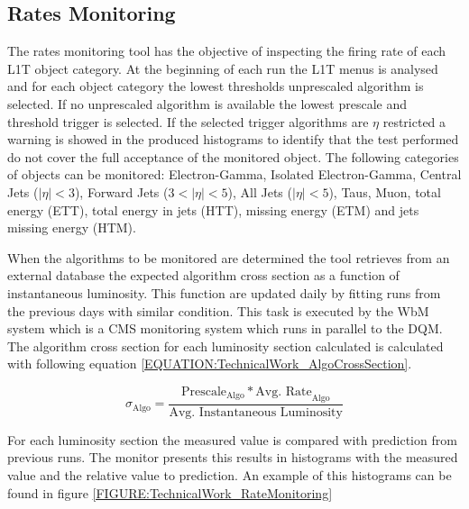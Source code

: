 \subsection{Rates Monitoring}
\label{SECTION:TechnicalWork_L1TDQM_RatesMonitoring}


The rates monitoring tool has the objective of inspecting the firing rate of each \gls{L1T} object category. At the beginning of each run the \gls{L1T} menus is analysed and for each object category the lowest thresholds unprescaled algorithm is selected. If no unprescaled algorithm is available the lowest prescale and threshold trigger is selected. If the selected trigger algorithms are $\eta$ restricted a warning is showed in the produced histograms to identify that the test performed do not cover the full acceptance of the monitored object. The following categories of objects can be monitored: Electron-Gamma, Isolated Electron-Gamma, Central Jets ($|\eta|<3$), Forward Jets ($3<|\eta|<5$), All Jets ($|\eta|<5$), Taus, Muon, total energy (ETT), total energy in jets (HTT), missing energy (ETM) and jets missing energy (HTM).

When the algorithms to be monitored are determined the tool retrieves from an external database the expected algorithm cross section as a function of instantaneous luminosity. This function are updated daily by fitting runs from the previous days with similar condition. This task is executed by the \gls{WbM} system which is a \gls{CMS} monitoring system which runs in parallel to the \gls{DQM}. The algorithm cross section for each luminosity section calculated is calculated with following equation \ref{EQUATION:TechnicalWork_AlgoCrossSection}.

\begin{equation}
\sigma_{\text{Algo}}=\frac{\text{Prescale}_{\text{Algo}}*{\text{Avg. Rate}_{\text{Algo}}}}{\text{Avg. Instantaneous Luminosity}}
\label{EQUATION:TechnicalWork_AlgoCrossSection}
\end{equation}

For each luminosity section the measured value is compared with prediction from previous runs. The monitor presents this results in histograms with the measured value and the relative value to prediction. An example of this histograms can be found in figure \ref{FIGURE:TechnicalWork_RateMonitoring}

